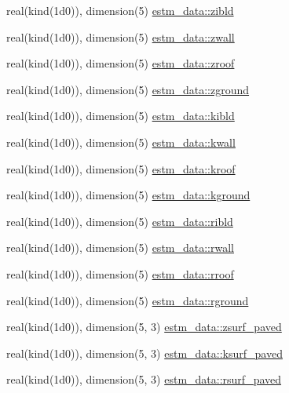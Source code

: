\begin{DoxyCompactItemize}
\item 
real(kind(1d0)), dimension(5) \hyperlink{namespaceestm__data_a6268c5a8d9d7a6835ad2906f53730588}{estm\+\_\+data\+::zibld}
\item 
real(kind(1d0)), dimension(5) \hyperlink{namespaceestm__data_add3c8dfcc5a6e9e0a8aa1f9a6d88a50c}{estm\+\_\+data\+::zwall}
\item 
real(kind(1d0)), dimension(5) \hyperlink{namespaceestm__data_af768a9da8007b24ee18243e681fb9fa7}{estm\+\_\+data\+::zroof}
\item 
real(kind(1d0)), dimension(5) \hyperlink{namespaceestm__data_a0cf74171fd4626303e99a6ef657ae1c3}{estm\+\_\+data\+::zground}
\item 
real(kind(1d0)), dimension(5) \hyperlink{namespaceestm__data_ad62e9580ef44ce102500c1a5db394ca4}{estm\+\_\+data\+::kibld}
\item 
real(kind(1d0)), dimension(5) \hyperlink{namespaceestm__data_a47c95a7ea355103f96297323577342aa}{estm\+\_\+data\+::kwall}
\item 
real(kind(1d0)), dimension(5) \hyperlink{namespaceestm__data_a4a6dc37f5a42699f54da6bd130191c07}{estm\+\_\+data\+::kroof}
\item 
real(kind(1d0)), dimension(5) \hyperlink{namespaceestm__data_a4bc69fd9c3630659ed7aa78ab5218b3e}{estm\+\_\+data\+::kground}
\item 
real(kind(1d0)), dimension(5) \hyperlink{namespaceestm__data_aeec5613d21243119700929bc31e4bef4}{estm\+\_\+data\+::ribld}
\item 
real(kind(1d0)), dimension(5) \hyperlink{namespaceestm__data_a76d29d9454cc82038e887a185e8e0c08}{estm\+\_\+data\+::rwall}
\item 
real(kind(1d0)), dimension(5) \hyperlink{namespaceestm__data_aab36dbd44cebff7b2d6bf3c8c505eca9}{estm\+\_\+data\+::rroof}
\item 
real(kind(1d0)), dimension(5) \hyperlink{namespaceestm__data_ae940330d6806444c16f7c8a9195800cf}{estm\+\_\+data\+::rground}
\item 
real(kind(1d0)), dimension(5, 3) \hyperlink{namespaceestm__data_a76774423276b4ee98c2791e6f3c601e6}{estm\+\_\+data\+::zsurf\+\_\+paved}
\item 
real(kind(1d0)), dimension(5, 3) \hyperlink{namespaceestm__data_ad0be589bd6851290e89cc3c869fce8ee}{estm\+\_\+data\+::ksurf\+\_\+paved}
\item 
real(kind(1d0)), dimension(5, 3) \hyperlink{namespaceestm__data_a263d4ea8134834255e133ba3ba191efc}{estm\+\_\+data\+::rsurf\+\_\+paved}
\item 

\end{DoxyCompactItemize}
